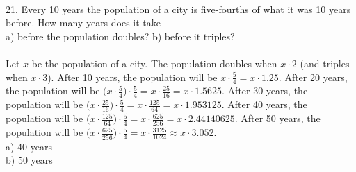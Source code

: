 \documentclass[12pt]{article}
\begin{document}
\\
21. Every 10 years the population of a city is five-fourths of what it was 10 years before. How many years does it take \\
a) before the population doubles? \hspace{1cm} b) before it triples? \\
\\
Let $x$ be the population of a city. The population doubles when $x\cdot2$ (and triples when $x\cdot3$). After 10 years, the population will be $x\cdot \displaystyle \frac{5}{4}=x\cdot1.25$. After 20 years, the population will be $\bigg(x\cdot \displaystyle \frac{5}{4}\bigg)\cdot \displaystyle \frac{5}{4}=x\cdot \displaystyle \frac{25}{16}=x\cdot1.5625$. After 30 years, the population will be $\bigg(x\cdot \displaystyle \frac{25}{16}\bigg)\cdot \displaystyle \frac{5}{4}=x\cdot \displaystyle \frac{125}{64}=x\cdot1.953125$. After 40 years, the population will be $\bigg(x\cdot \displaystyle \frac{125}{64}\bigg)\cdot \displaystyle \frac{5}{4}=x\cdot \displaystyle \frac{625}{256}=x\cdot2.44140625$. After 50 years, the population will be $\bigg(x\cdot \displaystyle \frac{625}{256}\bigg)\cdot \displaystyle \frac{5}{4}=x\cdot \displaystyle \frac{3125}{1024}\approx x\cdot3.052$. \\
a) 40 years \\
b) 50 years 
\end{document}
